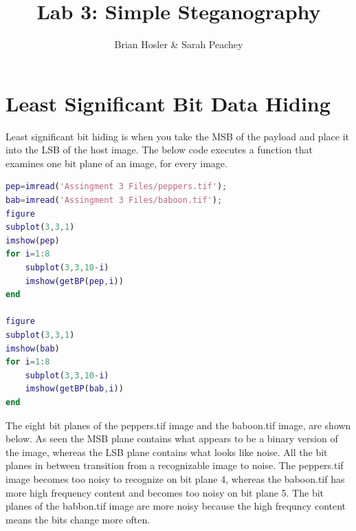 \documentclass{article}
\begin{document}
\title{Lab 3: Simple Steganography}
\author{Brian Hosler \& Sarah Peachey }
\maketitle 

\tableofcontents
\newpage


\section{Least Significant Bit Data Hiding}

Least significant bit hiding is when you take the MSB of the payload and
place it into the LSB of the host image. The below code executes a function that
examines one bit plane of an image, for every image. 

\begin{lstlisting}[language=Matlab]
pep=imread('Assingment 3 Files/peppers.tif');
bab=imread('Assingment 3 Files/baboon.tif');
figure
subplot(3,3,1)
imshow(pep)
for i=1:8
    subplot(3,3,10-i)
    imshow(getBP(pep,i))
end

figure
subplot(3,3,1)
imshow(bab)
for i=1:8
    subplot(3,3,10-i)
    imshow(getBP(bab,i))
end
\end{lstlisting}

The eight bit planes of the peppers.tif image and the baboon.tif image, are
shown below. As seen the MSB plane contains what appears to be a binary
version of the image, whereas the LSB plane contains what looks like noise.
All the bit planes in between transition from a recognizable image to noise.
The peppers.tif image becomes too noisy to recognize on bit plane 4,
whereas the baboon.tif has more high frequency content and becomes too
noisy on bit plane 5. The bit planes of the babbon.tif image are more noisy
because the high frequncy content means the bits change more often. 
\end{document}

